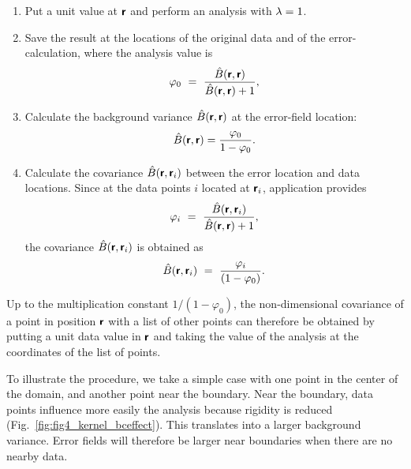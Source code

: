 \begin{enumerate}

\item Put a unit value at $\mbox{\boldmath $ \protect\mathsf{r} $}$ and perform an analysis with $\lambda=1$.

\item Save the result at the locations of the original data and of the error-calculation, where the analysis value is
\begin{equation}
\varphi_0 ~=~{ \hat{B} (\mbox{\boldmath $ \protect\mathsf{r} $},\mbox{\boldmath $ \protect\mathsf{r} $}) \over \hat{B}(\mbox{\boldmath $ \protect\mathsf{r} $},\mbox{\boldmath $ \protect\mathsf{r} $}) + 1 },
\end{equation}

\item Calculate the background variance $\hat{B}(\mbox{\boldmath $ \protect\mathsf{r} $},\mbox{\boldmath $ \protect\mathsf{r} $})$ at the error-field location:
\begin{equation}
\hat{B} (\mbox{\boldmath $ \protect\mathsf{r} $},\mbox{\boldmath $ \protect\mathsf{r} $}) = { \varphi_0 \over 1 - \varphi_0}.
\label{eq:brr}
\end{equation}

\item Calculate the covariance $\hat{B} (\mbox{\boldmath $ \protect\mathsf{r} $},\mbox{\boldmath $ \protect\mathsf{r} $}_i)$ between the error location and data locations. Since at the data points $i$ located at $\mbox{\boldmath $ \protect\mathsf{r} $}_i$, \diva application provides
\begin{equation}
\varphi_i ~=~ { \hat{B} (\mbox{\boldmath $ \protect\mathsf{r} $},\mbox{\boldmath $ \protect\mathsf{r} $}_i) \over \hat{B}(\mbox{\boldmath $ \protect\mathsf{r} $},\mbox{\boldmath $ \protect\mathsf{r} $}) + 1 },
\end{equation}
the covariance $\hat{B} (\mbox{\boldmath $ \protect\mathsf{r} $},\mbox{\boldmath $ \protect\mathsf{r} $}_i)$ is obtained as
\begin{equation}
\hat{B} (\mbox{\boldmath $ \protect\mathsf{r} $},\mbox{\boldmath $ \protect\mathsf{r} $}_i)~=~{\varphi_i \over ( 1-\varphi_0 )}.
\label{eq:btildco}
\end{equation}

\end{enumerate}

Up to the multiplication constant $1/(1-\varphi_0)$, the non-dimensional covariance of a point in position $\mbox{\boldmath $ \protect\mathsf{r} $}$ with a list of other points can therefore be obtained by putting a unit data value in $\mbox{\boldmath $ \protect\mathsf{r} $}$ and taking the value of the analysis at the coordinates of the list of points. 

To illustrate the procedure, we take a simple case with one point in the center of the domain, and another point near the boundary.
Near the boundary, data points influence more easily the analysis because rigidity is reduced (Fig.~\ref{fig:fig4_kernel_bceffect}). This translates into a larger background variance. Error fields will therefore be larger near boundaries when there are no nearby data.
 
